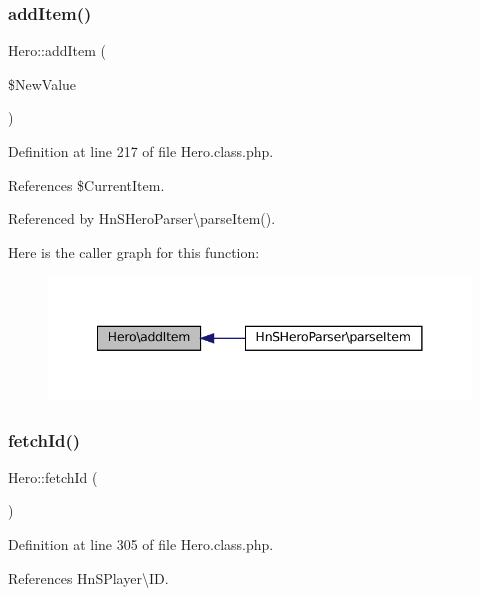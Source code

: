 \subsubsection{\texorpdfstring{add\+Item()}{addItem()}}
{\footnotesize\ttfamily Hero\+::add\+Item (\begin{DoxyParamCaption}\item[{}]{\$\+New\+Value }\end{DoxyParamCaption})}



Definition at line 217 of file Hero.\+class.\+php.



References \$\+Current\+Item.



Referenced by Hn\+S\+Hero\+Parser\textbackslash{}parse\+Item().

Here is the caller graph for this function\+:\nopagebreak
\begin{figure}[H]
\begin{center}
\leavevmode
\includegraphics[width=341pt]{class_hero_a089b98df69d37bcffa4daed4e0bde01b_icgraph}
\end{center}
\end{figure}
\mbox{\label{class_hero_a5aa91e7ea559a59c8151845a855fd546}} 
\subsubsection{\texorpdfstring{fetch\+Id()}{fetchId()}}
{\footnotesize\ttfamily Hero\+::fetch\+Id (\begin{DoxyParamCaption}{ }\end{DoxyParamCaption})\hspace{0.3cm}{\ttfamily [private]}}



Definition at line 305 of file Hero.\+class.\+php.



References Hn\+S\+Player\textbackslash{}\+ID.



